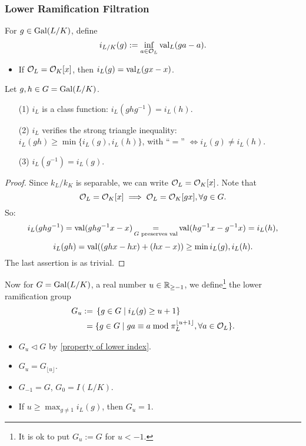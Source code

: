 \subsubsection{Lower Ramification Filtration}
For $g\in \operatorname{Gal}(L/K)$, define \[i_{L/K}(g) := \inf_{a\in\mathcal{O}_L}\operatorname{val}_L(ga - a).\]
\begin{itemize}
    \item If $\mathcal{O}_L = \mathcal{O}_K[x]$, then $i_L(g) = \operatorname{val}_L(gx - x)$.
\end{itemize}
\begin{proposition}\label{property of lower index}
    Let $g, h\in G = \operatorname{Gal}(L/K)$.\begin{enumerate}
        \item [(1)] $i_L$ is a class function: $i_L(ghg^{-1}) = i_L(h)$.
        \item [(2)] $i_L$ verifies the strong triangle inequality: $i_L(gh)\ge \min\{i_L(g), i_L(h)\}$, with ``$=$'' $\iff i_L(g)\ne i_L(h)$.
        \item [(3)] $i_L(g^{-1}) = i_L(g)$.
    \end{enumerate}
\end{proposition}
\begin{proof}
    Since $k_L/k_K$ is separable, we can write $\mathcal{O}_L = \mathcal{O}_K[x]$.
    Note that \[\mathcal{O}_L = \mathcal{O}_K[x]\implies \mathcal{O}_L = \mathcal{O}_K[gx], \forall g\in G.\]
    So:
\[i_L(ghg^{-1}) = \operatorname{val}(ghg^{-1}x - x) \mathop{=}_{G\text{ preserves val}} \operatorname{val}(hg^{-1}x - g^{-1}x) = i_L(h),\]
\[i_L(gh) = \operatorname{val}((ghx - hx) + (hx - x))\ge \min{i_L(g), i_L(h)}.\]
The last assertion is as trivial.
\end{proof}

Now for $G = \operatorname{Gal}(L/K)$, a real number $u\in\mathbb{R}_{\ge -1}$,
we define\footnote{It is ok to put $G_u := G$ for $u < -1$.} the lower ramification group
\begin{align*}
    G_u := {}& \left\{ g\in G\mid i_L(g)\ge u + 1 \right\}\\
    = {}& \{g\in G\mid ga \equiv a\bmod {\pi_L^{\lfloor u+1\rfloor}},\forall a\in\mathcal{O}_L\}.
\end{align*}

\begin{itemize}
    \item $G_u\vartriangleleft G$ by \cref{property of lower index}.
    \item $G_u = G_{\lfloor u\rfloor}$.
    \item $G_{-1} = G$, $G_0 = I(L/K)$.
    \item If $u\ge \max_{g\ne 1} i_L(g)$,
    then $G_u = 1$.
\end{itemize}

